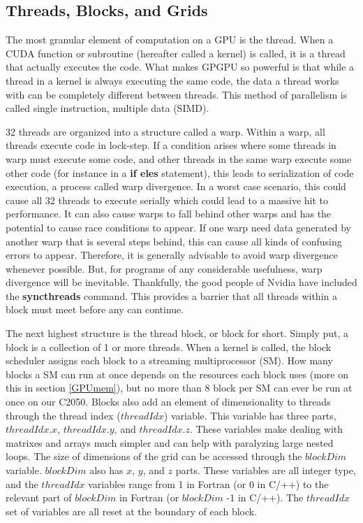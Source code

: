 \documentclass[12pt]{book}
\newcommand{\comm}[1]{\textbf{#1}}
\begin{document}
\subsection{Threads, Blocks, and Grids}\label{ThBlGr}
The most granular element of computation on a GPU is the thread. When a CUDA function or subroutine (hereafter called a kernel) is called, it is a thread that actually executes the code. What makes GPGPU so powerful is that while a thread in a kernel is always executing the same code, the data a thread works with can be completely different between threads. This method of parallelism is called single instruction, multiple data (SIMD). 

32 threads are organized into a structure called a warp. Within a warp, all threads execute code in lock-step. If a condition arises where some threads in warp must execute some code, and other threads in the same warp execute some other code (for instance in a \textbf{if eles} statement), this leads to serialization of code execution, a process called warp divergence. In a worst case scenario, this could cause all 32 threads to execute serially which could lead to a massive hit to performance. It can also cause warps to fall behind other warps and has the potential to cause race conditions to appear. If one warp need data generated by another warp that is several steps behind, this can cause all kinds of confusing errors to appear. Therefore, it is generally advisable to avoid warp divergence whenever possible. But, for programs of any considerable usefulness, warp divergence will be inevitable. Thankfully, the good people of Nvidia have included the \comm{syncthreads} command. This provides a barrier that all threads within a block must meet before any can continue. 

The next highest structure is the thread block, or block for short. Simply put, a block is a collection of 1 or more threads. When a kernel is called, the block scheduler assigns each block to a streaming multiprocessor (SM). How many blocks a SM can run at once depends on the resources each block uses (more on this in section \ref{GPUmem}), but no more than 8 block per SM can ever be run at once on our C2050. Blocks also add an element of dimensionality to threads through the thread index ($threadIdx$) variable. This variable has three parts, $threadIdx.x$, $threadIdx.y$, and $threadIdx.z$. These variables make dealing with matrixes and arrays much simpler and can help with paralyzing large nested loops. The size of dimensions of the grid can be accessed through the $blockDim$ variable. $blockDim$ also has $x$, $y$, and $z$ parts. These variables are all integer type, and the $threadIdx$ variables range from 1 in Fortran (or 0 in C/++) to the relevant part of $blockDim$ in Fortran (or $blockDim$ -1 in C/++). The $threadIdx$ set of variables are all reset at the boundary of each block. 
\end{document}
